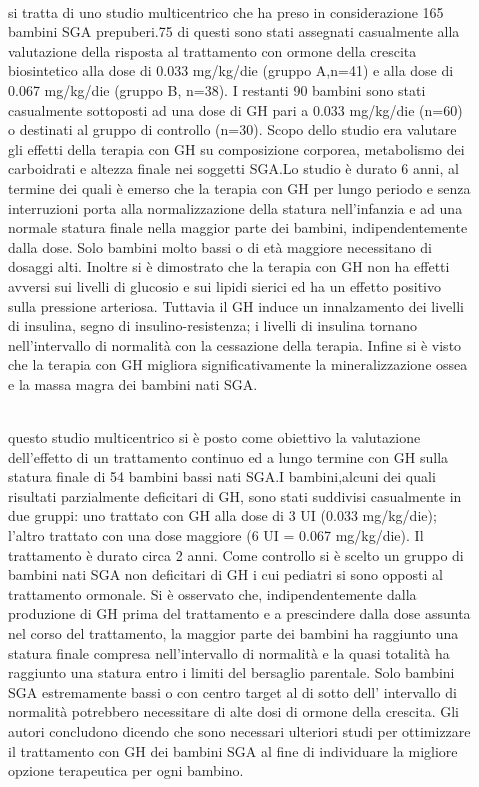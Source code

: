 \begin{description}
\item[\citet{hokken2003final}]
\hfill \\
si tratta di uno studio multicentrico che ha preso in considerazione 165 bambini SGA prepuberi.75 di questi sono stati assegnati casualmente alla valutazione della risposta al trattamento con ormone della crescita biosintetico alla dose di 0.033 mg/kg/die (gruppo A,n=41) e alla dose di 0.067 mg/kg/die (gruppo B, n=38). I restanti 90 bambini sono stati casualmente sottoposti ad una dose di GH pari a 0.033 mg/kg/die (n=60) o destinati al gruppo di controllo (n=30). Scopo dello studio era valutare gli effetti della terapia con GH su composizione corporea, metabolismo dei carboidrati e altezza finale nei soggetti SGA.Lo studio è durato 6 anni, al termine dei quali è emerso che la terapia con GH per lungo periodo e senza interruzioni porta alla normalizzazione della statura nell'infanzia e ad una normale statura finale nella maggior parte dei bambini, indipendentemente dalla dose. Solo bambini molto bassi o di età maggiore necessitano di dosaggi alti. Inoltre si è dimostrato che la terapia con GH non ha effetti avversi sui livelli di glucosio e sui lipidi sierici ed ha un effetto positivo sulla pressione arteriosa. Tuttavia il GH induce un innalzamento dei livelli  di insulina, segno di insulino-resistenza; i livelli di insulina tornano nell'intervallo di normalità con la cessazione della terapia. Infine si è visto che la terapia con GH migliora significativamente la mineralizzazione ossea e la massa magra dei bambini nati SGA. 

\item[{\parbox[t]{18cm}{Yvonne Van Pareren et al,\\The journal of clinical endocrinology \& metabolism 2003}}] \hfill \\
 questo studio multicentrico si è posto come obiettivo la valutazione dell'effetto di un trattamento continuo ed a lungo termine con GH sulla statura finale di 54 bambini bassi nati SGA.I bambini,alcuni dei quali risultati parzialmente  deficitari di GH, sono stati suddivisi casualmente in due gruppi: uno trattato con GH alla dose di 3 UI (0.033 mg/kg/die); l'altro trattato con una dose maggiore (6 UI = 0.067 mg/kg/die). Il trattamento è durato circa 2 anni. Come controllo si è scelto un gruppo di bambini nati SGA non deficitari di GH i cui pediatri si sono opposti al trattamento ormonale. Si è osservato che, indipendentemente dalla produzione di GH prima del trattamento e a prescindere dalla dose assunta nel corso del trattamento, la maggior parte dei bambini ha raggiunto una statura finale compresa nell'intervallo di normalità e la quasi totalità ha raggiunto una statura entro i limiti del bersaglio parentale. Solo bambini SGA estremamente bassi o con centro target al di sotto dell' intervallo di normalità potrebbero necessitare di alte dosi di ormone della crescita. Gli autori concludono dicendo che sono necessari ulteriori studi per ottimizzare il trattamento con GH dei bambini SGA al fine di individuare la migliore opzione terapeutica per ogni bambino. 


\end{description}
